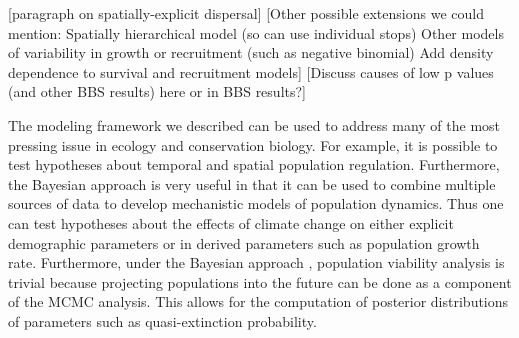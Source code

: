 \documentclass{article}
\begin{document}
[paragraph on spatially-explicit dispersal]
 [Other possible extensions we could mention:
	Spatially hierarchical model (so can use individual stops)
	Other models of variability in growth or recruitment (such as negative binomial)
	Add density dependence to survival and recruitment models]
[Discuss causes of low p values (and other BBS results) here or in BBS
results?]

The modeling framework we described can be used to address many of the
most pressing issue in ecology and conservation biology. For example,
it is possible to test hypotheses about temporal and spatial
population regulation. Furthermore, the Bayesian approach is very
useful in that it can be used to combine multiple sources of data to
develop mechanistic models of population dynamics. Thus one can test
hypotheses about the effects of climate change on either explicit
demographic parameters or in derived parameters such as population
growth rate. Furthermore, under the Bayesian approach , population
viability analysis is trivial because projecting populations into the
future can be done as a component of the MCMC analysis. This allows
for the computation of posterior distributions of parameters such as
quasi-extinction probability.





\end{document}
